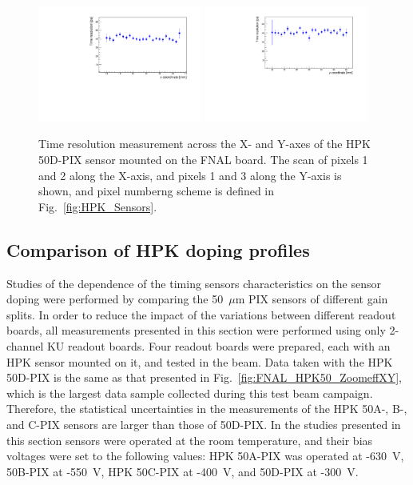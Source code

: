 \documentclass[preprint,1p]{elsarticle}
\begin{document}
\begin{figure}[htbp] 
\centering
\includegraphics[width=0.48\textwidth]{figs/FNALBoard_HPK50DPix_Run847-891/TimeResolution_vs_X_Ch4_5.pdf} 
\includegraphics[width=0.48\textwidth]{figs/FNALBoard_HPK50DPix_Run847-891/TimeResolution_vs_Y_Ch3_4.pdf} 
\caption{Time resolution measurement across the X- and Y-axes of the HPK 50D-PIX sensor mounted on the FNAL board. The scan of pixels 1 and 2 along the X-axis, and pixels 1 and 3 along the Y-axis is shown, and pixel numberng scheme is defined in Fig.~\ref{fig:HPK_Sensors}.} 
\label{fig:FNAL_HPK50_SigmaTXY} 
\end{figure} 




\subsection{Comparison of HPK doping profiles}

Studies of the dependence of the timing sensors characteristics on the sensor
doping were performed by comparing the 50~$\mu$m PIX sensors of different gain
splits. In order to reduce the impact of the variations between different
readout boards, all measurements presented in this section were performed using
only 2-channel KU readout boards. Four readout boards were prepared, each with
an HPK sensor mounted on it, and tested in the beam. Data taken with the HPK
50D-PIX is the same as that presented in Fig.~\ref{fig:FNAL_HPK50_ZoomeffXY},
which is the largest data sample collected during this test beam campaign.
Therefore, the statistical uncertainties in the measurements of the HPK 50A-,
B-, and C-PIX sensors are larger than those of 50D-PIX. In the studies presented
in this section sensors were operated at the room temperature, and their bias
voltages were set to the following values: HPK 50A-PIX was operated at -630~V,
50B-PIX at -550~V, HPK 50C-PIX at -400~V, and 50D-PIX at -300~V. 
\end{document}
